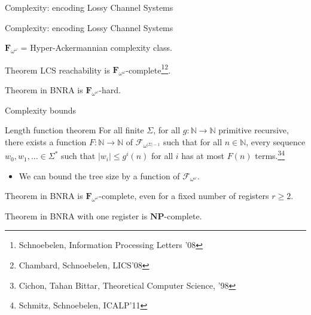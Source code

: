 \documentclass{beamer}
\begin{document}
\begin{frame}{Complexity: encoding Lossy Channel Systems}
	
	
	
\end{frame}

\begin{frame}{Complexity: encoding Lossy Channel Systems}
	
	$\mathbf{F}_{\omega^\omega}$ = Hyper-Ackermannian complexity class.
	
	\begin{block}{Theorem}
		LCS reachability is $\mathbf{F}_{\omega^\omega}$-complete\footnote{Schnoebelen, Information Processing Letters '08}\footnote{Chambard, Schnoebelen, LICS'08}.
	\end{block}
	
	\begin{block}{Theorem}
		{} in BNRA is $\mathbf{F}_{\omega^\omega}$-hard.
	\end{block}
	
\end{frame}

\begin{frame}{Complexity bounds}
	
	
	
	\begin{block}{Length function theorem}
		For all finite $\Sigma$, for all $g : \mathbb{N} \to \mathbb{N}$ primitive recursive, there exists a function $F : \mathbb{N} \to \mathbb{N}$ of $\mathcal{F}_{\omega^{|\Sigma|-1}}$ such that for all $n \in \mathbb{N}$, every sequence $w_0, w_1, \ldots \in \Sigma^*$ such that $|w_i| \leq g^i(n)$ for all $i$ has at most $F(n)$ terms.\footnote{Cichon, Tahan Bittar, Theoretical Computer Science, '98}\footnote{Schmitz, Schnoebelen, ICALP'11}
	\end{block}
	
	\begin{itemize}
		\item We can bound the tree size by a function of $\mathcal{F}_{\omega^{\omega}}$.
	\end{itemize}
	
%	
	\pause
	\begin{block}{Theorem}
		{} in BNRA is $\mathbf{F}_{\omega^\omega}$-complete, even for a fixed number of registers $r\geq 2$.
	\end{block}
	
	\pause
	
	\begin{block}{Theorem}
		 {} in BNRA with one register is $\mathbf{NP}$-complete.
	\end{block}
\end{frame}
\end{document}
